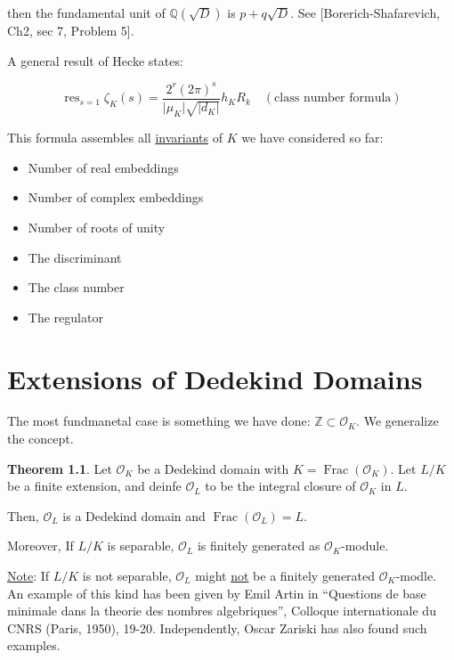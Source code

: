 \documentclass[openany]{amsbook}
\numberwithin{section}{chapter}
\theoremstyle{definition}
\newtheorem{theorem}{Theorem}[chapter]
\newcommand{\Frac}{\operatorname{Frac}}
\begin{document}
then the fundamental unit of \(\mathbb{Q}(\sqrt{D})\) is \(p + q \sqrt{D}\). See [Borerich-Shafarevich, Ch2, sec 7, Problem 5].

A general result of Hecke states:

\[
    \operatorname{res}_{s=1} \zeta_K (s) = \frac{2^r (2\pi)^s}{\vert \mu_K \vert \sqrt{\vert d_K \vert}} h_K R_k \quad (\text{class number formula})
\]

This formula assembles all \underline{invariants} of \(K\) we have considered so far:

\begin{itemize}
    \item Number of real embeddings
    \item Number of complex embeddings
    \item Number of roots of unity
    \item The discriminant
    \item The class number
    \item The regulator 
\end{itemize} 

\chapter{Extensions of Dedekind Domains}

The most fundmanetal case is something we have done: \(\mathbb{Z} \subset \mathcal{O}_K\). We generalize the concept.

\begin{theorem}
    Let \(\mathcal{O}_K\) be a Dedekind domain with \(K = \Frac(\mathcal{O}_K)\). Let \(L / K\) be a finite extension, and deinfe \(\mathcal{O}_L\) to be the integral closure of \(\mathcal{O}_K\) in \(L\).

    Then, \(\mathcal{O}_L\) is a Dedekind domain and \(\Frac(\mathcal{O}_L) = L\).
    
    Moreover, If \(L / K\) is separable, \(\mathcal{O}_L\) is finitely generated as \(\mathcal{O}_K\)-module.
\end{theorem}

\underline{Note}: If \(L/K\) is not separable, \(\mathcal{O}_L\) might \underline{not} be a finitely generated \(\mathcal{O}_K\)-modle. An example of this kind has been given by Emil Artin in ``Questions de base minimale dans la theorie des nombres algebriques'', Colloque internationale du CNRS (Paris, 1950), 19-20. Independently, Oscar Zariski has also found such examples. 
\end{document}
